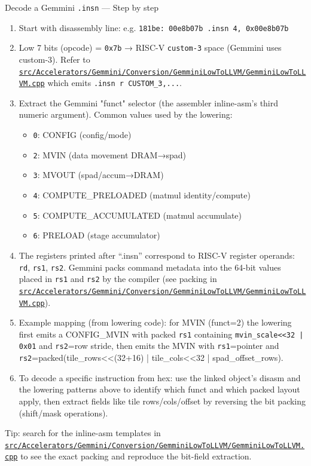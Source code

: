 \documentclass[aspectratio=169,10pt]{beamer}
\newcommand{\code}[1]{\texttt{\footnotesize #1}}
\newcommand{\repoRoot}{/home/lahcen/toolchains/onnx-mlir-xcompile/onnx-mlir}
\newcommand{\pathcode}[1]{\href{run:\repoRoot/#1}{\texttt{\scriptsize #1}}}
\begin{document}
\begin{frame}{Decode a Gemmini \code{.insn} — Step by step}
  \scriptsize
  \begin{enumerate}
    \item Start with disassembly line: e.g. \code{181be:  00e8b07b  .insn 4, 0x00e8b07b}
    \item Low 7 bits (opcode) = \code{0x7b} → RISC-V \code{custom-3} space (Gemmini uses custom-3). Refer to \pathcode{src/Accelerators/Gemmini/Conversion/GemminiLowToLLVM/GemminiLowToLLVM.cpp} which emits \code{.insn r CUSTOM_3,...}.
    \item Extract the Gemmini "funct" selector (the assembler inline-asm's third numeric argument). Common values used by the lowering:
      \begin{itemize}
        \item \code{0}: CONFIG (config/mode)
        \item \code{2}: MVIN (data movement DRAM→spad)
        \item \code{3}: MVOUT (spad/accum→DRAM)
        \item \code{4}: COMPUTE_PRELOADED (matmul identity/compute)
        \item \code{5}: COMPUTE_ACCUMULATED (matmul accumulate)
        \item \code{6}: PRELOAD (stage accumulator)
      \end{itemize}
    \item The registers printed after ``.insn'' correspond to RISC-V register operands: \code{rd}, \code{rs1}, \code{rs2}. Gemmini packs command metadata into the 64-bit values placed in \code{rs1} and \code{rs2} by the compiler (see packing in \pathcode{src/Accelerators/Gemmini/Conversion/GemminiLowToLLVM/GemminiLowToLLVM.cpp}).
    \item Example mapping (from lowering code): for MVIN (funct=2) the lowering first emits a CONFIG_MVIN with packed \code{rs1} containing \code{mvin_scale<<32 | 0x01} and \code{rs2}=row stride, then emits the MVIN with \code{rs1}=pointer and \code{rs2}=packed(tile_rows<<(32+16) | tile_cols<<32 | spad_offset_rows).
    \item To decode a specific instruction from hex: use the linked object's disasm and the lowering patterns above to identify which funct and which packed layout apply, then extract fields like tile rows/cols/offset by reversing the bit packing (shift/mask operations).
  \end{enumerate}

  \vspace{0.4em}
  {\tiny Tip: search for the inline-asm templates in \pathcode{src/Accelerators/Gemmini/Conversion/GemminiLowToLLVM/GemminiLowToLLVM.cpp} to see the exact packing and reproduce the bit-field extraction.}
\end{frame}
\end{document}
